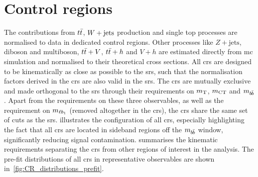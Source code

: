 \section{Control regions}\label{sec:control_regions}

The contributions from $t\bar{t}$, $W+\mathrm{jets}$ production and single top processes are normalised to data in dedicated control regions.
Other processes like $Z+\mathrm{jets}$, diboson and multiboson, $t\bar{t}+V$, $t\bar{t}+h$ and $V+h$ are estimated directly from \gls{mc} simulation and normalised to their theoretical cross sections.
All \glspl{cr} are designed to be kinematically as close as possible to the \glspl{sr}, such that the normalisation factors derived in the \glspl{cr} are also valid in the \glspl{sr}.
The \glspl{cr} are mutually exclusive and made orthogonal to the \glspl{sr} through their requirements on $m_{\textrm{T}}$, $m_{\textrm{CT}}$ and $m_{b\hspace{-0.06em}\bar{b}}$.
Apart from the requirements on these three observables, as well as the requirement on $m_{\ell b_{1}}$ (removed altogether in the \glspl{cr}), the \glspl{cr} share the same set of cuts as the \glspl{sr}.
 illustrates the configuration of all \glspl{cr}, especially highlighting the fact that all \glspl{cr} are located in sideband regions off the $m_{b\hspace{-0.06em}\bar{b}}$ window, significantly reducing signal contamination.
 summarises the kinematic requirements separating the \glspl{cr} from other regions of interest in the analysis. The pre-fit distributions of all \glspl{cr} in representative observables are shown in~\cref{fig:CR_distributions_prefit}.

